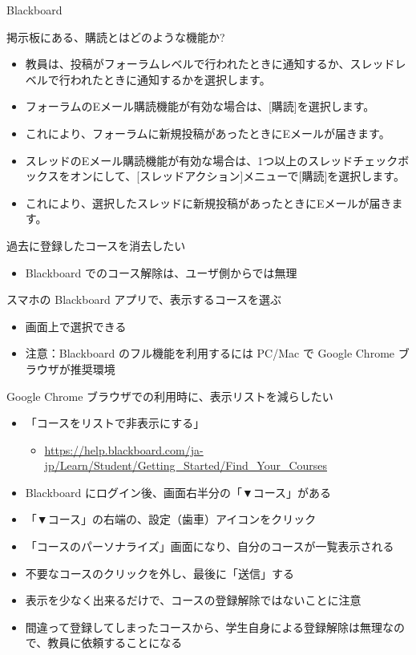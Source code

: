 \documentclass[a4j,10pt]{jsarticle}
\def\lthtmlcheckvsize{\ifdim\ht\sizebox<\vsize 
  \ifdim\wd\sizebox<\hsize\expandafter\hfill\fi \expandafter\vfill
  \else\expandafter\vss\fi}%
\begin{document}
{\begin{frame}[label={sec:orgc119bb0},fragile]{Blackboard}
\begin{block}{掲示板にある、購読とはどのような機能か?}
\begin{itemize}
\item 教員は、投稿がフォーラムレベルで行われたときに通知するか、スレッドレベルで行われたときに通知するかを選択します。
\item フォーラムのEメール購読機能が有効な場合は、[購読]を選択します。
\item これにより、フォーラムに新規投稿があったときにEメールが届きます。
\item スレッドのEメール購読機能が有効な場合は、1つ以上のスレッドチェックボックスをオンにして、[スレッドアクション]メニューで[購読]を選択します。
\item これにより、選択したスレッドに新規投稿があったときにEメールが届きます。
\end{itemize}
\end{block}
\par
\begin{block}{過去に登録したコースを消去したい}
\begin{itemize}
\item Blackboard でのコース解除は、ユーザ側からでは無理
\end{itemize}
\end{block}
\par
\begin{block}{スマホの Blackboard アプリで、表示するコースを選ぶ}
\begin{itemize}
\item 画面上で選択できる
\item 注意：Blackboard のフル機能を利用するには PC/Mac で Google Chrome ブラウザが推奨環境
\end{itemize}
\end{block}
\par
\begin{block}{Google Chrome ブラウザでの利用時に、表示リストを減らしたい}
\begin{itemize}
\item 「コースをリストで非表示にする」
\begin{itemize}
\item \url{https://help.blackboard.com/ja-jp/Learn/Student/Getting\_Started/Find\_Your\_Courses}
\end{itemize}
\par
\item Blackboard にログイン後、画面右半分の「▼コース」がある
\item 「▼コース」の右端の、設定（歯車）アイコンをクリック
\item 「コースのパーソナライズ」画面になり、自分のコースが一覧表示される
\item 不要なコースのクリックを外し、最後に「送信」する
\item 表示を少なく出来るだけで、コースの登録解除ではないことに注意
\item 間違って登録してしまったコースから、学生自身による登録解除は無理なので、教員に依頼することになる
\end{itemize}
\end{block}
\end{frame}%
\lthtmlfigureZ
\lthtmlcheckvsize\clearpage}
\end{document}

